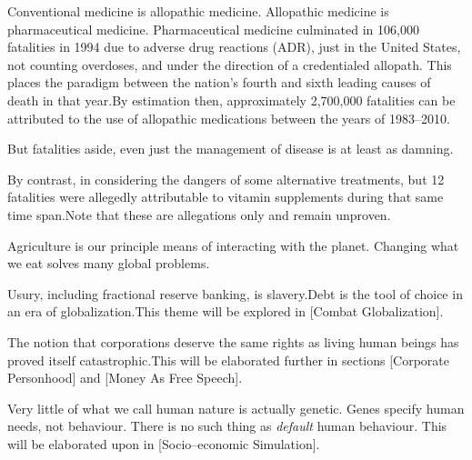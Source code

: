 
Conventional medicine is allopathic medicine. Allopathic medicine is pharmaceutical medicine. Pharmaceutical medicine culminated in 106,000 fatalities in 1994 due to adverse drug reactions (ADR), just in the United States, not counting overdoses, and under the direction of a credentialed allopath. This places the paradigm between the nation's fourth and sixth leading causes of death in that year. By estimation then, approximately 2,700,000 fatalities can be attributed to the use of allopathic medications between the years of 1983--2010. 

But fatalities aside, even just the management of disease is at least as damning.\footnotecite[leape2000]

By contrast, in considering the dangers of some alternative treatments, but 12 fatalities were allegedly attributable to vitamin supplements during that same time span. Note that these are allegations only and remain unproven.


Agriculture is our principle means of interacting with the planet. Changing what we eat solves many global problems.


Usury, including fractional reserve banking, is slavery. Debt is the tool of choice in an era of globalization.\footnotecite[perkins2005] This theme will be explored in [Combat Globalization].


The notion that corporations deserve the same rights as living human beings has proved itself catastrophic. This will be elaborated further in sections \in{}[Corporate Personhood] and \in{}[Money As Free Speech].


Very little of what we call human nature is actually genetic. Genes specify human needs, not behaviour. There is no such thing as {\it default} human behaviour. This will be elaborated upon in [Socio--economic Simulation].
\stopitemize

